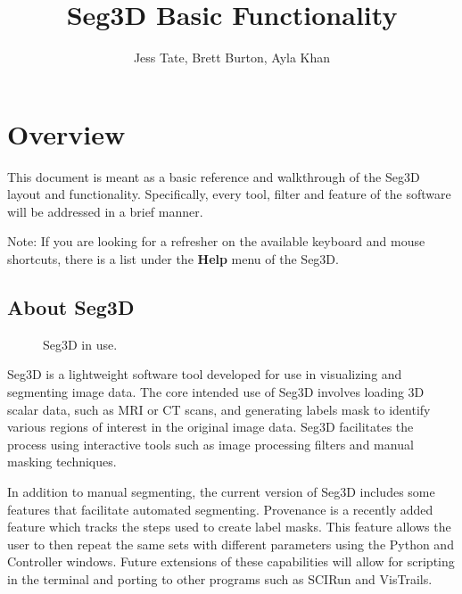 \documentclass[fleqn,11pt,openany]{book}
\title{Seg3D Basic Functionality}
\author{Jess Tate, Brett Burton, Ayla Khan}
\begin{document}
\maketitle


\chapter{Overview}
\label{sec:overview}

\begin{introduction}
This document is meant as a basic reference and walkthrough of the Seg3D layout and functionality.  Specifically, every tool, filter and feature of the software will be addressed in a brief manner.

Note:  If you are looking for a refresher on the available keyboard and mouse shortcuts, there is a list under the \textbf{Help} menu of the Seg3D.  
\end{introduction}

\section{About Seg3D}

\begin{figure}
\caption{Seg3D in use.}\label{fig:layout}
\end{figure}

Seg3D is a lightweight software tool developed for use in visualizing and segmenting image data.
The core intended use of Seg3D involves loading 3D scalar data, such as MRI or CT scans, and generating labels mask to identify various regions of interest in the original image data.  Seg3D facilitates the process using interactive tools such as image processing filters and manual masking techniques.  

In addition to manual segmenting, the current version of Seg3D includes some features that facilitate automated segmenting.
Provenance is a recently added feature which tracks the steps used to create label masks.
This feature allows the user to then repeat the same sets with different parameters using the Python and Controller windows.
Future extensions of these capabilities will allow for scripting in the terminal and porting to other programs such as SCIRun and VisTrails.
\end{document}
